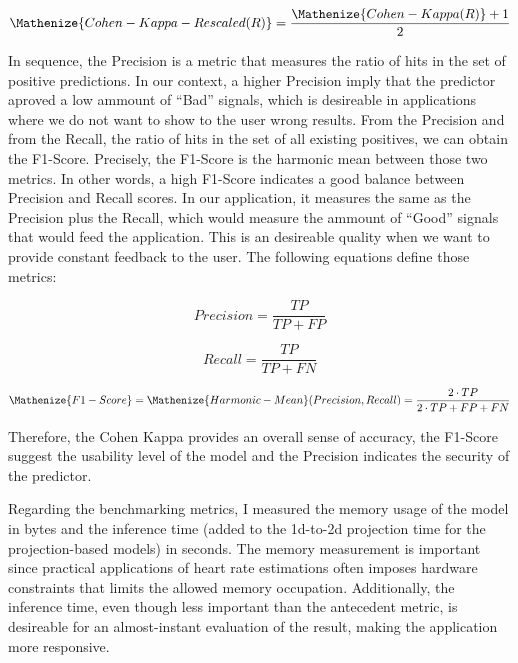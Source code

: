 \begin{equation}
\Mathenize{Cohen-Kappa-Rescaled(R)} = \frac{\Mathenize{Cohen-Kappa(R)}+1}{2} 
\end{equation}  

In sequence, the Precision is a metric that measures the ratio of hits in the set of positive predictions. In our context, a higher Precision imply that the predictor aproved a low ammount of ``Bad'' signals, which is desireable in applications where we do not want to show to the user wrong results. From the Precision and from the Recall, the ratio of hits in the set of all existing positives, we can obtain the F1-Score. Precisely, the F1-Score is the harmonic mean between those two metrics. In other words, a high F1-Score indicates a good balance between Precision and Recall scores. In our application, it measures the same as the Precision plus the Recall, which would measure the ammount of ``Good'' signals that would feed the application. This is an desireable quality when we want to provide constant feedback to the user. The following equations define those metrics:

\begin{equation} \label{eq:Precision}
Precision = \frac{TP}{TP+FP}
\end{equation}


\begin{equation} \label{eq:Recall}
Recall = \frac{TP}{TP+FN}
\end{equation}

\begin{equation} \label{eq:F1-Score}
\Mathenize{F1-Score}  = \Mathenize{Harmonic-Mean}(Precision,Recall) = \frac{2 \cdot TP}{2 \cdot TP + FP + FN}
\end{equation}

\noindent Therefore, the Cohen Kappa provides an overall sense of accuracy, the F1-Score suggest the usability level of the model and the Precision indicates the security of the predictor. 

Regarding the benchmarking metrics, I measured the memory usage of the model in bytes and the inference time (added to the 1d-to-2d projection time for the projection-based models) in seconds. The memory measurement is important since practical applications of heart rate estimations often imposes hardware constraints that limits the allowed memory occupation. Additionally, the inference time, even though less important than the antecedent metric, is desireable for an almost-instant evaluation of the result, making the application more responsive.
